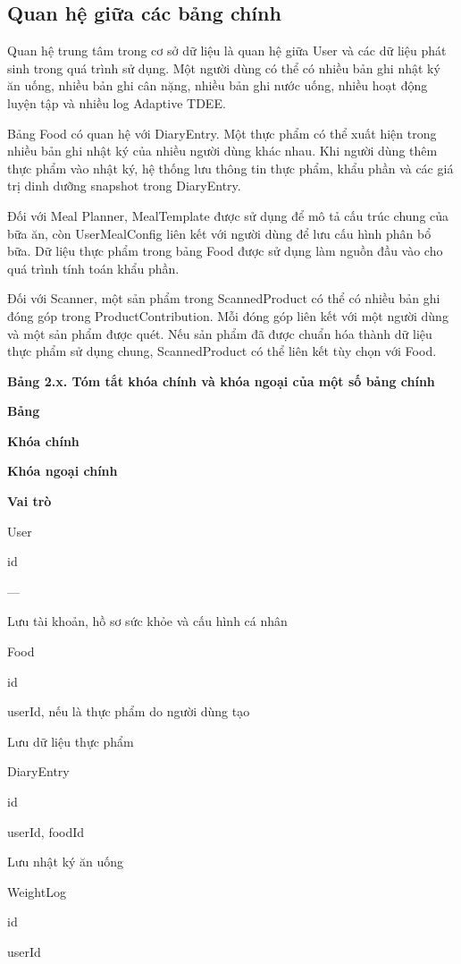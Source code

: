 \documentclass[12pt, a4paper]{report}
\begin{document}
\subsection{Quan hệ giữa các bảng chính}Quan hệ trung tâm trong cơ sở dữ liệu là quan hệ giữa User và các dữ liệu phát sinh trong quá trình sử dụng. Một người dùng có thể có nhiều bản ghi nhật ký ăn uống, nhiều bản ghi cân nặng, nhiều bản ghi nước uống, nhiều hoạt động luyện tập và nhiều log Adaptive TDEE.

Bảng Food có quan hệ với DiaryEntry. Một thực phẩm có thể xuất hiện trong nhiều bản ghi nhật ký của nhiều người dùng khác nhau. Khi người dùng thêm thực phẩm vào nhật ký, hệ thống lưu thông tin thực phẩm, khẩu phần và các giá trị dinh dưỡng snapshot trong DiaryEntry.

Đối với Meal Planner, MealTemplate được sử dụng để mô tả cấu trúc chung của bữa ăn, còn UserMealConfig liên kết với người dùng để lưu cấu hình phân bổ bữa. Dữ liệu thực phẩm trong bảng Food được sử dụng làm nguồn đầu vào cho quá trình tính toán khẩu phần.

Đối với Scanner, một sản phẩm trong ScannedProduct có thể có nhiều bản ghi đóng góp trong ProductContribution. Mỗi đóng góp liên kết với một người dùng và một sản phẩm được quét. Nếu sản phẩm đã được chuẩn hóa thành dữ liệu thực phẩm sử dụng chung, ScannedProduct có thể liên kết tùy chọn với Food.

\textbf{Bảng 2.x. Tóm tắt khóa chính và khóa ngoại của một số bảng chính}

\textbf{Bảng}

\textbf{Khóa chính}

\textbf{Khóa ngoại chính}

\textbf{Vai trò}

User

id

—

Lưu tài khoản, hồ sơ sức khỏe và cấu hình cá nhân

Food

id

userId, nếu là thực phẩm do người dùng tạo

Lưu dữ liệu thực phẩm

DiaryEntry

id

userId, foodId

Lưu nhật ký ăn uống

WeightLog

id

userId
\end{document}

